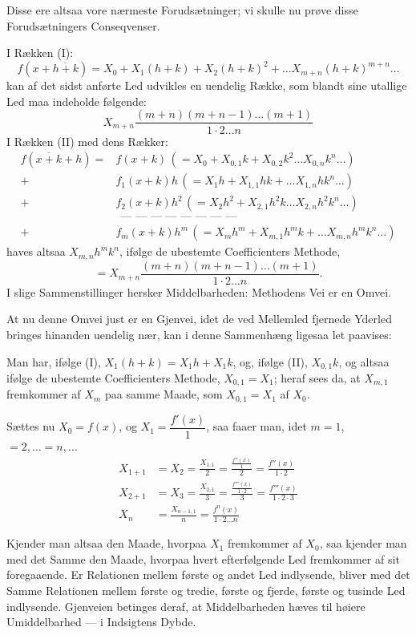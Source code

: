 \documentclass[12pt]{book}
\newcommand{\opage}[1]{\marginnote{\footnotesize\textit{[#1]}}}
\begin{document}
Disse ere altsaa vore nærmeste Forudsætninger; vi skulle nu prøve disse
Forudsætningers Conseqvenser.

I Rækken (I):
\[
f(x + \overline{h+k}) = X_0 + X_1(h+k) + X_2(h+k)^{2} + \dots
X_{m+n}(h+k)^{m+n}\dots
\]
kan af det sidst anførte Led udvikles en
\opage{44} uendelig Række, som blandt sine utallige Led maa indeholde følgende:
\[
X_{m+n}\frac{(m+n)(m+n-1)\dots(m+1)}{1\cdot 2\dots n}
\]
I Rækken (II) med dens Rækker:
\[
\begin{aligned}
f(\overline{x+k}+h) = {}& f(x+k)\,(= X_0 + X_{0,1}k + X_{0,2}k^{2}\dots
X_{0,n}k^{n}\dots)\\
+{}& f_1(x+k)h\,(= X_1 h + X_{1,1}hk + \dots X_{1,n}hk^{n}\dots)\\
+{}& f_2(x+k)h^{2}\,(= X_2 h^{2} + X_{2,1}h^{2}k \dots X_{2,n}h^{2}k^{n}\dots)\\
&\ \ \text{--- --- --- --- --- --- --- ---}\\
+{}& f_m(x+k)h^{m}\,(= X_m h^{m} + X_{m,1}h^{m}k + \dots X_{m,n}h^{m}k^{n}\dots)
\end{aligned}
\]
haves altsaa $X_{m,n}h^{m}k^{n}$, ifølge de ubestemte Coefficienters Methode,
\[
= X_{m+n}\frac{(m+n)(m+n-1)\dots(m+1)}{1\cdot 2\dots n}.
\]
I slige Sammenstillinger hersker Middelbarheden: Methodens Vei er en Omvei.

At nu denne Omvei just er en Gjenvei, idet de ved Mellemled fjernede Yderled
bringes hinanden uendelig nær, kan i denne Sammenhæng ligesaa let paavises:

Man har, ifølge (I), $X_1(h+k) = X_1 h + X_1 k$, og, ifølge (II), $X_{0,1}k$, og
altsaa ifølge de ubestemte Coefficienters Methode, $X_{0,1} = X_1$; heraf sees
da, at $X_{m,1}$ fremkommer af $X_m$ paa samme Maade, som $X_{0,1} = X_1$ af
$X_0$.

Sættes nu $X_0 = f(x)$, og $X_1 = \dfrac{f'(x)}{1}$, saa faaer man, idet $m = 1$,
$= 2, \dots = n, \dots$
\begin{align*}
X_{1+1} &= X_2 = \frac{X_{1,1}}{2} = \frac{\frac{f''(x)}{1}}{2}
= \frac{f''(x)}{1\cdot 2}\\
X_{2+1} &= X_3 = \frac{X_{2,1}}{3} = \frac{\frac{f'''(x)}{1\cdot 2}}{3}
= \frac{f'''(x)}{1\cdot 2\cdot 3}\\
X_n &= \frac{X_{n-1,1}}{n} = \frac{f^{n}(x)}{1\cdot 2\dots n}
\end{align*}

\opage{45} Kjender man altsaa den Maade, hvorpaa $X_1$ fremkommer af $X_0$, saa kjender man
med det Samme den Maade, hvorpaa hvert efterfølgende Led fremkommer af sit
foregaaende. Er Relationen mellem første og andet Led indlysende, bliver med det
Samme Relationen mellem første og tredie, første og fjerde, første og tusinde Led
indlysende. Gjenveien betinges deraf, at Middelbarheden hæves til høiere
Umiddelbarhed --- i Indsigtens Dybde.
\end{document}
